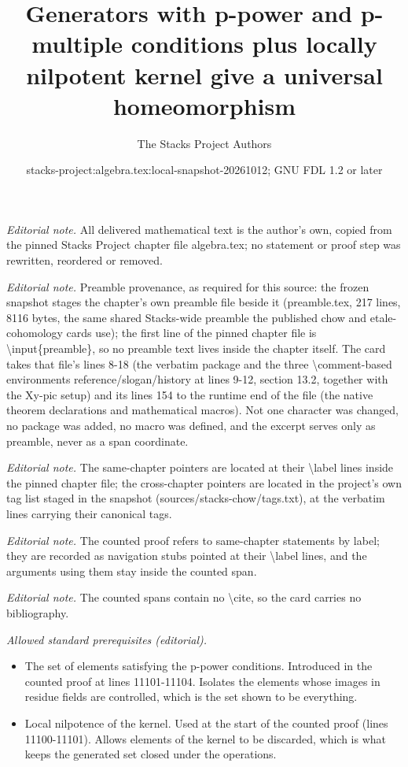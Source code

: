 \documentclass[10pt,a4paper]{amsart}
\title{Generators with p-power and p-multiple conditions plus locally nilpotent kernel give a universal homeomorphism}
\author{The Stacks Project Authors}
\date{stacks-project:algebra.tex:local-snapshot-20261012; GNU FDL 1.2 or later}
\theoremstyle{plain}
\theoremstyle{definition}
\theoremstyle{remark}
\numberwithin{equation}{subsection}
\begin{document}
\maketitle
\noindent\textit{Editorial note.} All delivered mathematical text is the author's own, copied from the pinned Stacks Project chapter file algebra.tex; no statement or proof step was rewritten, reordered or removed.\par\medskip
\noindent\textit{Editorial note.} Preamble provenance, as required for this source: the frozen snapshot stages the chapter's own preamble file beside it (preamble.tex, 217 lines, 8116 bytes, the same shared Stacks-wide preamble the published chow and etale-cohomology cards use); the first line of the pinned chapter file is \textbackslash{}input\{preamble\}, so no preamble text lives inside the chapter itself. The card takes that file's lines 8-18 (the verbatim package and the three \textbackslash{}comment-based environments reference/slogan/history at lines 9-12, section 13.2, together with the Xy-pic setup) and its lines 154 to the runtime end of the file (the native theorem declarations and mathematical macros). Not one character was changed, no package was added, no macro was defined, and the excerpt serves only as preamble, never as a span coordinate.\par\medskip
\noindent\textit{Editorial note.} The same-chapter pointers are located at their \textbackslash{}label lines inside the pinned chapter file; the cross-chapter pointers are located in the project's own tag list staged in the snapshot (sources/stacks-chow/tags.txt), at the verbatim lines carrying their canonical tags.\par\medskip
\noindent\textit{Editorial note.} The counted proof refers to same-chapter statements by label; they are recorded as navigation stubs pointed at their \textbackslash{}label lines, and the arguments using them stay inside the counted span.\par\medskip
\noindent\textit{Editorial note.} The counted spans contain no \textbackslash{}cite, so the card carries no bibliography.\par\medskip
\noindent\textit{Allowed standard prerequisites (editorial).}\begin{itemize}
\item The set of elements satisfying the p-power conditions. Introduced in the counted proof at lines 11101-11104. Isolates the elements whose images in residue fields are controlled, which is the set shown to be everything.
\item Local nilpotence of the kernel. Used at the start of the counted proof (lines 11100-11101). Allows elements of the kernel to be discarded, which is what keeps the generated set closed under the operations.
\end{itemize}\medskip
\end{document}
